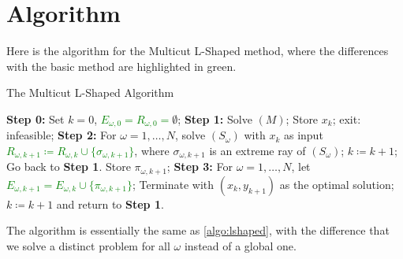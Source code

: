 \documentclass[12pt, openany]{report}
\theoremstyle{definition}
\begin{document}
\section{Algorithm}
Here is the algorithm for the Multicut L-Shaped method, where the differences with the basic method are highlighted in green.
\begin{algorithm}[H]
	\caption{The Multicut L-Shaped Algorithm}
	\label{algo:multicut}
	\begin{algorithmic}[1]
		\State \textbf{Step 0:} Set $k=0$, \textcolor{green}{$E_{\omega,0} = R_{\omega,0}=$}$ \emptyset$;
		\State \textbf{Step 1:} Solve $(M)$;
		 \State Store $x_k$;
		\Else \State exit: infeasible;
		\EndIf
		\State \textbf{Step 2:} For $\omega=1,\dots,N$, solve $(S_\omega)$ with $x_k$ as input
		\State \textcolor{green}{$R_{\omega,k+1}\coloneqq R_{\omega, k} \cup \{\sigma_{\omega,k+1}\}$}, where $\sigma_{\omega, k+1}$ is an extreme ray of $(S_\omega)$;
		\State $k\coloneqq k+1$;
		\State Go back to \textbf{Step 1}.
		\Else \State Store $\pi_{\omega,k+1}$;
		\EndIf 
		\State \textbf{Step 3:} For $\omega=1,\dots,N$, let \textcolor{green}{$E_{\omega,k+1} = E_{\omega,k} \cup \{\pi_{\omega,k+1}\}$};
		\State Terminate with $(x_k,y_{k+1})$ as the optimal solution;
		\Else \State $k\coloneqq k+1$ and return to \textbf{Step 1}.
		\EndIf 
	\end{algorithmic}
\end{algorithm}
The algorithm is essentially the same as \ref{algo:lshaped}, with the difference that we solve a distinct problem for all $\omega$ instead of a global one. 
\end{document}
